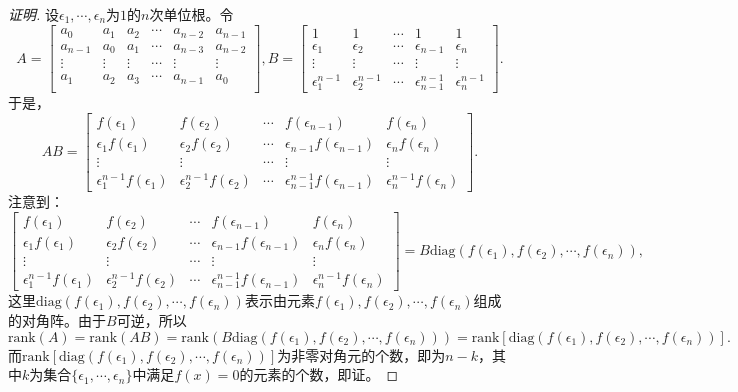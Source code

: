 \documentclass[UTF8]{ctexart}
\begin{document}
\begin{proof}[证明]设$\epsilon_1, \cdots, \epsilon_n$为$1$的$n$次单位根。令
	\[
	A = \begin{bmatrix}
		a_0 & a_1 & a_2 & \cdots & a_{n-2} & a_{n-1} \\
		a_{n-1} & a_0 & a_1 &\cdots & a_{n-3} & a_{n-2} \\
		\vdots & \vdots & \vdots & \cdots & \vdots & \vdots \\
		a_1 & a_2 & a_3 & \cdots & a_{n-1} & a_{0} \\
	\end{bmatrix}, 
	B = \begin{bmatrix}
		1 & 1 &  \cdots & 1 & 1 \\
		\epsilon_1 & \epsilon_2  &\cdots & \epsilon_{n-1} & \epsilon_{n} \\
		\vdots & \vdots & \cdots & \vdots & \vdots \\
		\epsilon_1^{n-1} & \epsilon_2^{n-1}  & \cdots & \epsilon_{n-1}^{n-1} & \epsilon_{n}^{n-1}
	\end{bmatrix}.
	\]
	于是，
	\[
	AB = \begin{bmatrix}
		f(\epsilon_1) & f(\epsilon_2)  &  \cdots & f(\epsilon_{n-1})  & f(\epsilon_{n}) \\
		\epsilon_1f(\epsilon_1)  & \epsilon_2f(\epsilon_2)   &\cdots & \epsilon_{n-1}f(\epsilon_{n-1}) & \epsilon_{n}f(\epsilon_{n}) \\
		\vdots & \vdots & \cdots & \vdots & \vdots \\
		\epsilon_1^{n-1}f(\epsilon_1)  & \epsilon_2^{n-1}f(\epsilon_2)   & \cdots & \epsilon_{n-1}^{n-1}f(\epsilon_{n-1}) & \epsilon_{n}^{n-1}f(\epsilon_{n})
	\end{bmatrix}.
	\]
	注意到：
	\[
	\begin{bmatrix}
		f(\epsilon_1) & f(\epsilon_2)  &  \cdots & f(\epsilon_{n-1})  & f(\epsilon_{n}) \\
		\epsilon_1f(\epsilon_1)  & \epsilon_2f(\epsilon_2)   &\cdots & \epsilon_{n-1}f(\epsilon_{n-1}) & \epsilon_{n}f(\epsilon_{n}) \\
		\vdots & \vdots & \cdots & \vdots & \vdots \\
		\epsilon_1^{n-1}f(\epsilon_1)  & \epsilon_2^{n-1}f(\epsilon_2)   & \cdots & \epsilon_{n-1}^{n-1}f(\epsilon_{n-1}) & \epsilon_{n}^{n-1}f(\epsilon_{n})
	\end{bmatrix} = B \mathrm{diag}(f(\epsilon_1), f(\epsilon_2), \cdots, f(\epsilon_n)),
	\]
	这里$\mathrm{diag}(f(\epsilon_1), f(\epsilon_2), \cdots, f(\epsilon_n))$表示由元素$f(\epsilon_1), f(\epsilon_2), \cdots, f(\epsilon_n)$组成的对角阵。由于$B$可逆，所以
	\[
	\mathrm{rank}(A) = \mathrm{rank}(AB) = \mathrm{rank}(B\mathrm{diag}(f(\epsilon_1), f(\epsilon_2), \cdots, f(\epsilon_n))) = \mathrm{rank}[\mathrm{diag}(f(\epsilon_1), f(\epsilon_2), \cdots, f(\epsilon_n))].
	\]
	而$\mathrm{rank}[\mathrm{diag}(f(\epsilon_1), f(\epsilon_2), \cdots, f(\epsilon_n))]$为非零对角元的个数，即为$n - k$，其中$k$为集合$\{\epsilon_1, \cdots, \epsilon_n\}$中满足$f(x) = 0$的元素的个数，即证。
\end{proof}
\clearpage
\listofchanges
\end{document}
